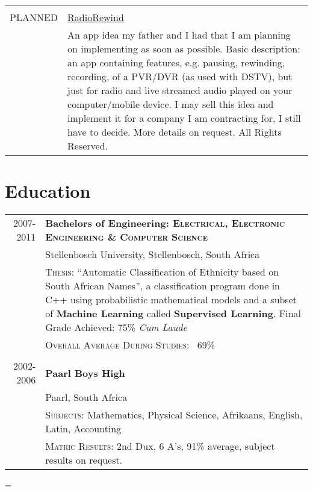 \documentclass[a4paper,10pt,notitlepage]{article}
\newenvironment{absolutelynopagebreak}
  {\par\nobreak\vfil\penalty0\vfilneg
   \vtop\bgroup}
  {\par\xdef\tpd{\the\prevdepth}\egroup
   \prevdepth=\tpd}
\begin{document}
\begin{absolutelynopagebreak}
\begin{tabular}{r|p{11cm}}
		\multicolumn{2}{c}{} \\
		\textsc{PLANNED}            &                                                                                                                  
		\href{www.laurcode.com}{RadioRewind}\\&\footnotesize{An app idea my father and I had that I am planning on implementing as soon as possible. Basic description: an app containing features, e.g. pausing, rewinding, recording, of a PVR/DVR (as used with DSTV), but just for radio and live streamed audio played on your computer/mobile device. I may sell this idea and implement it for a company I am contracting for, I still have to decide. More details on request. All Rights Reserved.} \\
		
	\end{tabular}
	
	\section{Education}
	\begin{tabular}{r|p{11cm}}
		
		\textsc{2007-2011} & \textbf{Bachelors of Engineering: \textsc{Electrical, Electronic Engineering \& Computer Science}} \\
		& Stellenbosch University, Stellenbosch, South Africa \\
		& \textsc{Thesis}: ``Automatic Classification of Ethnicity based on South African Names'', a classification program done in C++ using probabilistic mathematical models and a subset of \textbf{Machine Learning} called \textbf{Supervised Learning}. \small Final Grade Achieved: 75\% \textit{Cum Laude} \\
		&\normalsize \textsc{Overall Average During Studies}: ~69\% \\
		
		\multicolumn{2}{c}{}\\
		
		\textsc{2002-2006} & \textbf{Paarl Boys High} \\ & \normalsize Paarl, South Africa \\
		&\textsc{Subjects}: Mathematics, Physical Science, Afrikaans, English, Latin, Accounting \\
		&\normalsize \textsc{Matric Results}: 2nd Dux, 6 A's, 91\% average, subject results on request. \\
		
	\end{tabular}
	
\end{absolutelynopagebreak}
\end{document}
